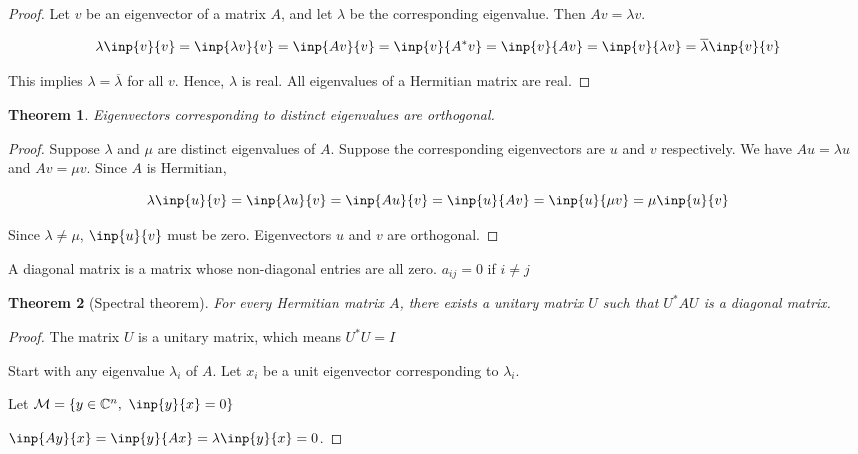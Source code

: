 \documentclass[twofold]{article}
\newcommand*\conj[1]{\overline{#1}}
\newcommand*\adj[1]{#1^*}
\theoremstyle{plain}
\newtheorem{theorem}{Theorem}
\theoremstyle{definition}
\theoremstyle{remark}
\begin{document}
\begin{proof}
Let \(v\) be an eigenvector of a matrix \(A\), and let \(\lambda\) be the corresponding eigenvalue. Then \(Av = \lambda v\). 

\[ \lambda\inp{v}{v} = \inp{\lambda v}{v} =  \inp{Av}{v} = \inp{v}{\adj{A}v} = \inp{v}{Av} = \inp{v}{\lambda v} = \conj{\lambda} \inp{v}{v}\]

This implies \(\lambda = \conj{\lambda}\) for all \(v\). Hence, \(\lambda\) is real. All eigenvalues of a Hermitian matrix are real.
 \end{proof}



\begin{theorem} Eigenvectors corresponding to distinct eigenvalues are orthogonal.\end{theorem}

\begin{proof} Suppose \(\lambda\) and \(\mu\) are distinct eigenvalues of \(A\). Suppose the corresponding eigenvectors are \(u\) and \(v\) respectively. We have \(Au = \lambda u\) and \(Av = \mu v\). Since \(A\) is Hermitian, 

\[ \lambda \inp{u}{v} = \inp{\lambda u}{v} = \inp{A u}{v} = \inp{u}{Av} = \inp{u}{\mu v} = \mu \inp{u}{v} \]

Since \(\lambda \ne \mu\), \(\inp{u}{v}\) must be zero. Eigenvectors \(u\) and \(v\) are orthogonal.

\end{proof}



A diagonal matrix is a matrix whose non-diagonal entries are all zero. \(a_{ij} = 0\) if \(i \ne j\)

\begin{theorem}[Spectral theorem]  For every Hermitian matrix \(A\), there exists a unitary matrix \(U\) such that \( \adj{U} A  U\) is a diagonal matrix. \end{theorem}

\begin{proof} 
The matrix \(U\) is a unitary matrix, which means \(\adj{U} U = I\)



Start with any eigenvalue \(\lambda_i\) of \(A\). Let \(x_i\) be a unit eigenvector corresponding to \(\lambda_i\).

Let \(\mathcal{M} = \{y \in \mathbb{C}^n, \ \inp{y}{x} = 0\}\)

\(\inp{Ay}{x} = \inp{y}{Ax} = \lambda \inp{y}{x} = 0\).

\end{proof}
\end{document}
